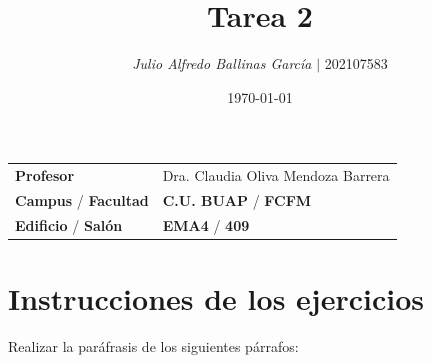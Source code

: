 \documentclass{article}
\title{Tarea 2}
\author{\emph{Julio Alfredo Ballinas García} $\boldsymbol{\mid}$ 202107583}
\date{\today}
\begin{document}
\maketitle



\begin{mybox}
\noindent\begin{tabular}{@{}ll}
	{\bfseries{Profesor}} & Dra. Claudia Oliva Mendoza Barrera\\
	\textcolor{prussianblue}{\bfseries{Campus}} / \textcolor{trueblue}{\bfseries{Facultad}}  & \textcolor{prussianblue}{\bfseries{C.U. BUAP}} /  \textcolor{trueblue}{\bfseries{FCFM}} \\
	\textcolor{prussianblue}{\bfseries{Edificio}} /  \textcolor{trueblue}{\bfseries{Salón}}    & 	\textcolor{prussianblue}{\bfseries{EMA4}} /  \textcolor{trueblue}{\bfseries{409}}   
\end{tabular} 
\end{mybox} \vspace{1cm}

\section{Instrucciones de los ejercicios}

Realizar la paráfrasis de los siguientes párrafos:
\end{document}
